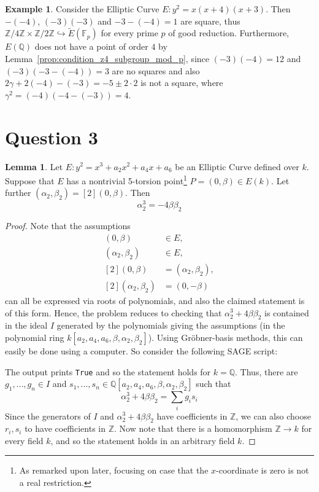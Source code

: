 \documentclass{scrartcl}
\newcommand{\Z}{\mathbb{Z}}
\newcommand{\F}{\mathbb{F}}
\newcommand{\Q}{\mathbb{Q}}
\theoremstyle{definition}
\newtheorem{lemma}[subsection]{Lemma}
\newtheorem{example}[subsection]{Example}
\begin{document}
\begin{example}
    Consider the Elliptic Curve $E: y^2 = x(x + 4)(x + 3)$.
    Then $-(-4)$, $(-3)(-3)$ and $-3 - (-4) = 1$ are square, thus $\Z/4\Z \times \Z/2\Z \hookrightarrow \tilde{E}(\F_p)$ for every prime $p$ of good reduction.
    Furthermore, $E(\Q)$ does not have a point of order $4$ by Lemma~\ref{prop:condition_z4_subgroup_mod_p}, since $(-3)(-4) = 12$ and $(-3)(-3 - (-4)) = 3$ are no squares and also $2\gamma + 2(-4) - (-3) = -5 \pm 2 \cdot 2$ is not a square, where $\gamma^2 = (-4)(-4 - (-3)) = 4$.
\end{example}

\section{Question 3}
\begin{lemma}
    \label{prop:relation_y_uv}
    Let $E: y^2 = x^3 + a_2 x^2 + a_4 x + a_6$ be an Elliptic Curve defined over $k$.
    Suppose that $E$ has a nontrivial 5-torsion point\footnote{As remarked upon later, focusing on case that the $x$-coordinate is zero is not a real restriction.} $P = (0, \beta) \in E(k)$.
    Let further $(\alpha_2, \beta_2) = [2](0, \beta)$.
    Then
    \begin{equation*}
        \alpha_2^3 = -4\beta\beta_2
    \end{equation*}
\end{lemma}
\begin{proof}
    Note that the assumptions
    \begin{align*}
        (0, \beta) &\in E, \\
        (\alpha_2, \beta_2) &\in E, \\
        [2](0, \beta) &= (\alpha_2, \beta_2), \\
        [2](\alpha_2, \beta_2) &= (0, -\beta)
    \end{align*}
    can all be expressed via roots of polynomials, and also the claimed statement is of this form.
    Hence, the problem reduces to checking that $\alpha_2^3 + 4\beta\beta_2$ is contained in the ideal $I$ generated by the polynomials giving the assumptions (in the polynomial ring $k[a_2, a_4, a_6, \beta, \alpha_2, \beta_2]$).
    Using Gröbner-basis methods, this can easily be done using a computer.  
    So consider the following SAGE script:
    
    The output prints \lstinline{True} and so the statement holds for $k = \Q$.
    Thus, there are $g_1, ..., g_n \in I$ and $s_1, ..., s_n \in \Q[a_2, a_4, a_6, \beta, \alpha_2, \beta_2]$ such that
    \begin{equation*}
        \alpha_2^3 + 4\beta\beta_2 = \sum_i g_i s_i
    \end{equation*}
    Since the generators of $I$ and $\alpha_2^3 + 4\beta\beta_2$ have coefficients in $\Z$, we can also choose $r_i, s_i$ to have coefficients in $\Z$.
    Now note that there is a homomorphism $\Z \to k$ for every field $k$, and so the statement holds in an arbitrary field $k$.
\end{proof}
\end{document}
